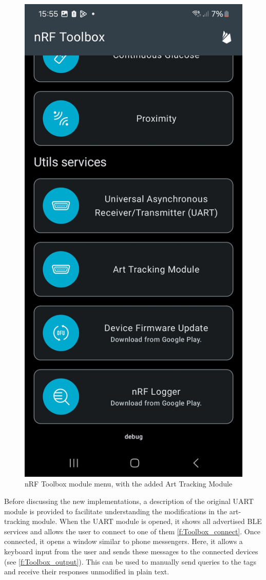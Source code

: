 \begin{figure}[ht!]
	\centering
	\includegraphics[trim={0 4cm 0 3cm},clip, width=.4\linewidth]{graphics/nRF_toolbox_modules.jpg}
	\caption{nRF Toolbox module menu, with the added Art Tracking Module}
	\label{f:Toolbox_modules}
\end{figure}

Before discussing the new implementations, a description of the original UART module is provided to facilitate understanding the modifications in the art-tracking module.
When the UART module is opened, it shows all advertised BLE services and allows the user to connect to one of them \ref{f:Toolbox_connect}.
Once connected, it opens a window similar to phone messengers.
Here, it allows a keyboard input from the user and sends these messages to the connected devices (see \ref{f:Toolbox_output}).
This can be used to manually send queries to the tags and receive their responses unmodified in plain text.

